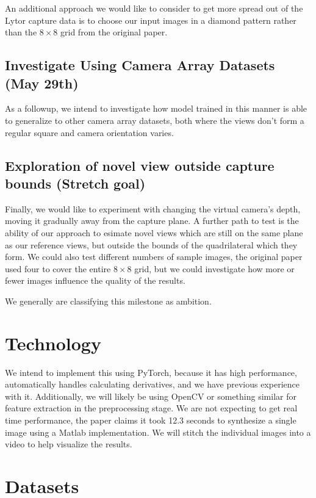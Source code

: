 \documentclass[10pt,twocolumn,letterpaper]{article}
\begin{document}
An additional approach we would like to consider to get more spread out of the Lytor capture data
is to choose our input images in a diamond pattern rather than the $8 \times 8$ grid from the original
paper.

\subsection{Investigate Using Camera Array Datasets (May 29th)}

As a followup, we intend to investigate how model trained in this manner is
able to generalize to other camera array datasets, both where the views don't form
a regular square and camera orientation varies.

\subsection{Exploration of novel view outside capture bounds (Stretch goal)}

Finally, we would like to experiment with changing the virtual camera's depth, moving it gradually
away from the capture plane. A further path to test is the ability of our approach to esimate novel
views which are still on the same plane as our reference views, but outside the bounds of the
quadrilateral which they form. We could also test different numbers of sample images, the original
paper used four to cover the entire $8 \times 8$ grid, but we could investigate how more or fewer images
influence the quality of the results. 

We generally are classifying this milestone as ambition.

\section{Technology}

We intend to implement this using PyTorch, because it has high performance, 
automatically handles calculating derivatives, and we have previous experience with it.
Additionally, we will likely be using OpenCV or something similar for feature extraction
in the preprocessing stage.
We are not expecting to get real time performance, the paper claims it took 12.3 seconds to synthesize
a single image using a Matlab implementation. We will stitch the individual images into a video to
help visualize the results.

\section{Datasets}
\end{document}
